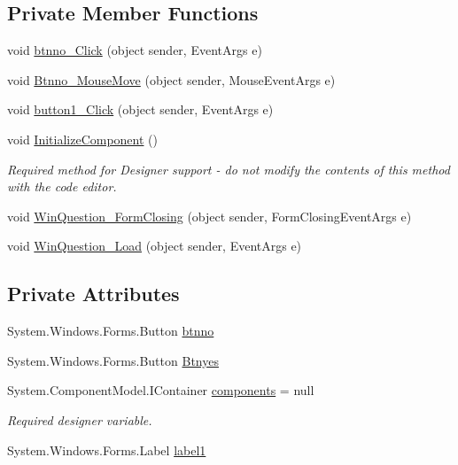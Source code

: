 \subsection*{Private Member Functions}
\begin{DoxyCompactItemize}
\item 
void \hyperlink{class__7___doroshenko__forms2__is52_1_1_win_question_addf298ada9a525f8c97dbb9f930d6719}{btnno\+\_\+\+Click} (object sender, Event\+Args e)
\item 
void \hyperlink{class__7___doroshenko__forms2__is52_1_1_win_question_ab81a4bed4ecc573353c189976316a282}{Btnno\+\_\+\+Mouse\+Move} (object sender, Mouse\+Event\+Args e)
\item 
void \hyperlink{class__7___doroshenko__forms2__is52_1_1_win_question_afa7b81836252b133aaec65147788b6c8}{button1\+\_\+\+Click} (object sender, Event\+Args e)
\item 
void \hyperlink{class__7___doroshenko__forms2__is52_1_1_win_question_aaec60c526c71252de0eb231ee16a876c}{Initialize\+Component} ()
\begin{DoxyCompactList}\small\item\em Required method for Designer support -\/ do not modify the contents of this method with the code editor. \end{DoxyCompactList}\item 
void \hyperlink{class__7___doroshenko__forms2__is52_1_1_win_question_ace95f250fa359610e86f5fedd278e67e}{Win\+Question\+\_\+\+Form\+Closing} (object sender, Form\+Closing\+Event\+Args e)
\item 
void \hyperlink{class__7___doroshenko__forms2__is52_1_1_win_question_a5d411864ac52b7998aba29e9adb8f902}{Win\+Question\+\_\+\+Load} (object sender, Event\+Args e)
\end{DoxyCompactItemize}
\subsection*{Private Attributes}
\begin{DoxyCompactItemize}
\item 
System.\+Windows.\+Forms.\+Button \hyperlink{class__7___doroshenko__forms2__is52_1_1_win_question_ae5d5b9cd03491cb98cb1ed10aab2469b}{btnno}
\item 
System.\+Windows.\+Forms.\+Button \hyperlink{class__7___doroshenko__forms2__is52_1_1_win_question_ac516c18821f9ff0a33bb10d41b51db4e}{Btnyes}
\item 
System.\+Component\+Model.\+I\+Container \hyperlink{class__7___doroshenko__forms2__is52_1_1_win_question_ad8b2952aae1000f120f3aaa8ab63697f}{components} = null
\begin{DoxyCompactList}\small\item\em Required designer variable. \end{DoxyCompactList}\item 
System.\+Windows.\+Forms.\+Label \hyperlink{class__7___doroshenko__forms2__is52_1_1_win_question_ac84f9387bd3683c5a3ac30ff987eaba1}{label1}
\end{DoxyCompactItemize}


